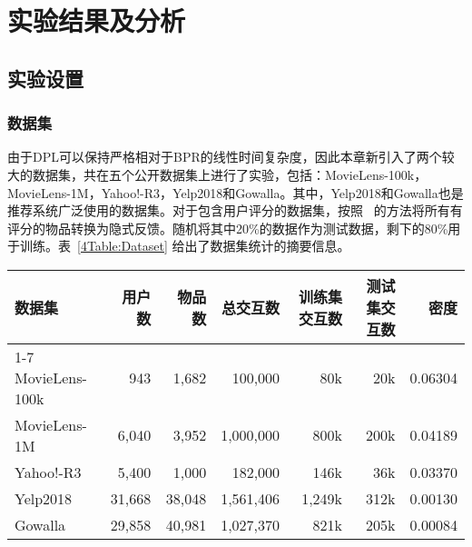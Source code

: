 \section{实验结果及分析}\label{pairsec:exp}
\subsection{实验设置}
\subsubsection{数据集}
由于DPL可以保持严格相对于BPR的线性时间复杂度，因此本章新引入了两个较大的数据集，共在五个公开数据集上进行了实验，包括：MovieLens-100k，MovieLens-1M，Yahoo!-R3，Yelp2018和Gowalla。其中，Yelp2018和Gowalla也是推荐系统广泛使用的数据集\cite{Wang:2019:SIGIR,Xiangnan:2020:SIGIR}。对于包含用户评分的数据集，按照~\cite{Steffen:2009:UAI,Zhang:2013:SIGIR,Steffen:2014:WSDM} 的方法将所有有评分的物品转换为隐式反馈。随机将其中20\%的数据作为测试数据，剩下的80\%用于训练。表~\ref{4Table:Dataset} 给出了数据集统计的摘要信息。
\begin{table*}[h!]
	\centering
	\small
	\caption{数据集统计信息}\label{4Table:Dataset}
	\begin{tabular}{lrrrrrr}
		\toprule[1.2pt]
		数据集          & 用户数  & 物品数  &总交互数 & 训练集交互数  &测试集交互数&密度 \\ \cline{1-7}
		MovieLens-100k   &   943    &  1,682   &100,000&    80k	   & 20k &0.06304\\
		MovieLens-1M    &   6,040  &  3,952   &1,000,000&  800k     & 200k&0.04189  \\
		Yahoo!-R3       &   5,400  &  1,000  &182,000 &   146k      & 36k&0.03370\\
		Yelp2018       &   31,668  &  38,048&   1,561,406&   1,249k     & 312k&0.00130  \\
		Gowalla       &   29,858 &  40,981  &1,027,370 &   821k     & 205k&0.00084 \\
		\bottomrule[1.2pt]
	\end{tabular}
\end{table*}
